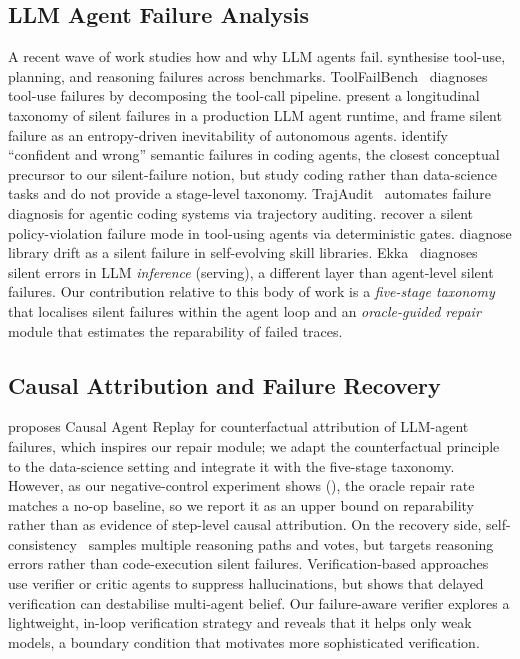 \subsection{LLM Agent Failure Analysis}
A recent wave of work studies how and why LLM agents fail. \citet{albayaydh2026beyond} synthesise tool-use, planning, and reasoning failures across benchmarks. ToolFailBench~\citep{soni2026toolfailbench} diagnoses tool-use failures by decomposing the tool-call pipeline. \citet{wu2026when} present a longitudinal taxonomy of silent failures in a production LLM agent runtime, and \citet{liu2026silent} frame silent failure as an entropy-driven inevitability of autonomous agents. \citet{mehta2026confident} identify ``confident and wrong'' semantic failures in coding agents, the closest conceptual precursor to our silent-failure notion, but study coding rather than data-science tasks and do not provide a stage-level taxonomy. TrajAudit~\citep{wang2026trajaudit} automates failure diagnosis for agentic coding systems via trajectory auditing. \citet{reddy2026reason} recover a silent policy-violation failure mode in tool-using agents via deterministic gates. \citet{zhang2026library} diagnose library drift as a silent failure in self-evolving skill libraries. Ekka~\citep{gu2026ekka} diagnoses silent errors in LLM \emph{inference} (serving), a different layer than agent-level silent failures. Our contribution relative to this body of work is a \emph{five-stage taxonomy} that localises silent failures within the agent loop and an \emph{oracle-guided repair} module that estimates the reparability of failed traces.

\subsection{Causal Attribution and Failure Recovery}
\citet{shah2026causal} proposes Causal Agent Replay for counterfactual attribution of LLM-agent failures, which inspires our repair module; we adapt the counterfactual principle to the data-science setting and integrate it with the five-stage taxonomy. However, as our negative-control experiment shows (), the oracle repair rate matches a no-op baseline, so we report it as an upper bound on reparability rather than as evidence of step-level causal attribution. On the recovery side, self-consistency~\citep{wang2022selfconsistency} samples multiple reasoning paths and votes, but targets reasoning errors rather than code-execution silent failures. Verification-based approaches~\citep{itkin2026delayed} use verifier or critic agents to suppress hallucinations, but \citet{itkin2026delayed} shows that delayed verification can destabilise multi-agent belief. Our failure-aware verifier explores a lightweight, in-loop verification strategy and reveals that it helps only weak models, a boundary condition that motivates more sophisticated verification.

